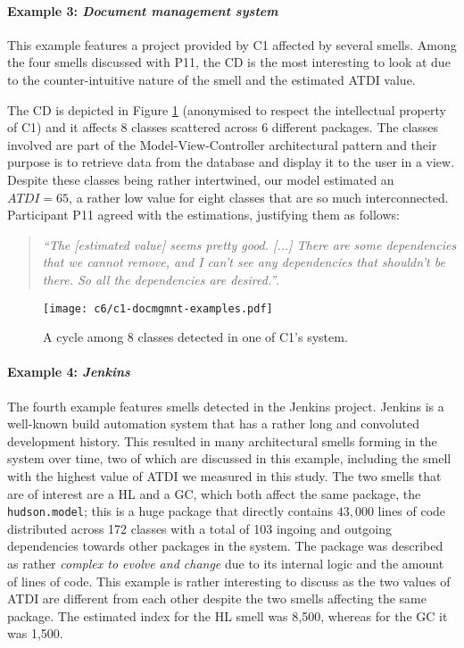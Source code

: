 \paragraph{Example 3: \emph{Document management system}}
This example features a project provided by C1 affected by several smells.
Among the four smells discussed with P11, the CD is the most interesting to look at due to the counter-intuitive nature of the smell and the estimated ATDI value.

The CD is depicted in Figure \ref{c6:fig:c1-docmgmnt-examples} (anonymised to respect the intellectual property of C1) and it affects 8 classes scattered across 6 different packages. 
The classes involved are part of the Model-View-Controller architectural pattern and their purpose is to retrieve data from the database and display it to the user in a view.
Despite these classes being rather intertwined, our model estimated an $ATDI = 65$, a rather low value for eight classes that are so much interconnected. Participant P11 agreed with the estimations, justifying them as follows:

\begin{quote}
    \emph{``The [estimated value] seems pretty good. [...] There are some dependencies that we cannot remove, and I can't see any dependencies that shouldn't be there. So all the dependencies are desired.''}.  
\end{quote}

\begin{figure}
    \centering
    \texttt{[image: c6/c1-docmgmnt-examples.pdf]}
    \caption{A cycle among 8 classes detected in one of C1's system.}
    \label{c6:fig:c1-docmgmnt-examples}
\end{figure}

\paragraph{Example 4: \emph{Jenkins}}
The fourth example features smells detected in the Jenkins project.
Jenkins is a well-known build automation system that has a rather long and convoluted development history.
This resulted in many architectural smells forming in the system over time, two of which are discussed in this example, including the smell with the highest value of ATDI we measured in this study.
The two smells that are of interest are a HL and a GC, which both affect the same package, the \texttt{hudson.model}; this is a huge package that directly contains $43,000$ lines of code distributed across 172 classes with a total of 103 ingoing and outgoing dependencies towards other packages in the system.
The package was described as rather \emph{complex to evolve and change} due to its internal logic and the amount of lines of code.
This example is rather interesting to discuss as the two values of ATDI are different from each other despite the two smells affecting the same package.
The estimated index for the HL smell was 8,500, whereas for the GC it was 1,500.

